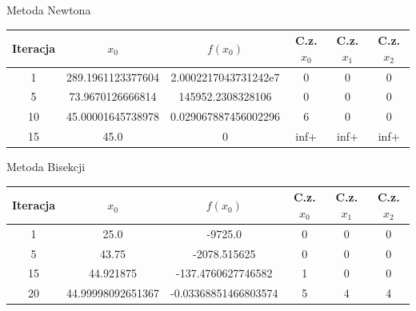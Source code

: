 \documentclass[a4paper]{article}
\begin{document}
    \begin{center}
        Metoda Newtona
    \end{center}
    \begin{center}
        \begin{tabular}{|c|c|c|c|c|c|} 
            \hline
            Iteracja & $x_0$ & $f(x_0)$ & C.z. $x_0$ & C.z. $x_1$ & C.z. $x_2$ \\
            \hline
            1 & 289.1961123377604 & 2.0002217043731242e7 & 0 & 0 & 0 \\
            \hline
            5 & 73.9670126666814 & 145952.2308328106 & 0 & 0 & 0 \\
            \hline
            10 & 45.00001645738978 & 0.029067887456002296 & 6 & 0 & 0 \\
            \hline
            15 & 45.0 & 0 & inf+ & inf+ & inf+ \\
            \hline
        \end{tabular}
    \end{center}
        
    \vspace{5mm}

    \begin{center}
        Metoda Bisekcji
    \end{center}
    \begin{center}
        \begin{tabular}{|c|c|c|c|c|c|} 
            \hline
            Iteracja & $x_0$ & $f(x_0)$ & C.z. $x_0$ & C.z. $x_1$ & C.z. $x_2$ \\
            \hline
            1 & 25.0 & -9725.0 & 0 & 0 & 0 \\
            \hline
            5 & 43.75 & -2078.515625 & 0 & 0 & 0 \\
            \hline
            15 & 44.921875 & -137.4760627746582 & 1 & 0 & 0 \\
            \hline
            20 & 44.99998092651367 & -0.03368851466803574 & 5 & 4 & 4 \\
            \hline
        \end{tabular}
    \end{center}
    
    \vspace{5mm}
\end{document}
